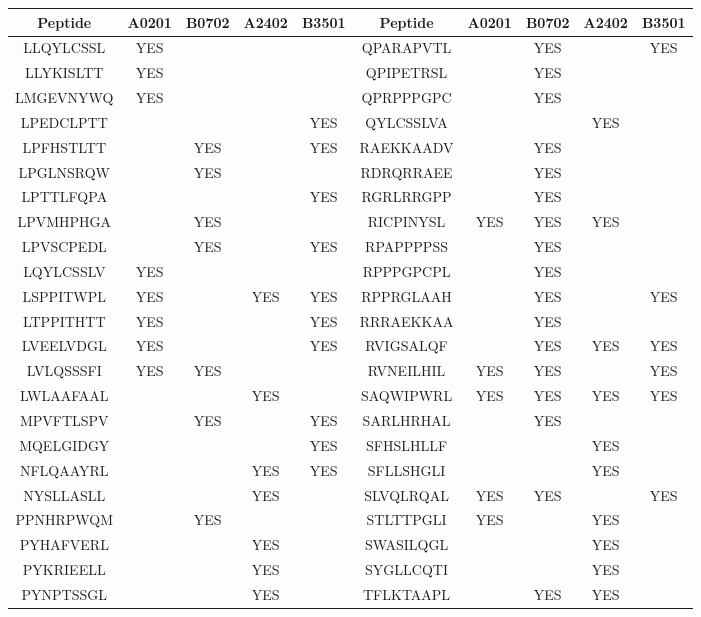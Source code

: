 \begin{table}[htp]
\begin{center}
\begin{sideways}
\begin{tabulary}{1.5\textwidth}{|c|c|c|c|c|c|c|c|c|c|}
\hline
Peptide & A0201 & B0702 & A2402 & B3501 & Peptide & A0201 & B0702 & A2402 & B3501 \bigstrut \\
\hline
LLQYLCSSL & YES &  &  &  & QPARAPVTL &  & YES &  & YES \bigstrut[t] \\
LLYKISLTT & YES &  &  &  & QPIPETRSL &  & YES &  &  \\
LMGEVNYWQ & YES &  &  &  & QPRPPPGPC &  & YES &  &  \\
LPEDCLPTT &  &  &  & YES & QYLCSSLVA &  &  & YES &  \\
LPFHSTLTT &  & YES &  & YES & RAEKKAADV &  & YES &  &  \\
LPGLNSRQW &  & YES &  &  & RDRQRRAEE &  & YES &  &  \\
LPTTLFQPA &  &  &  & YES & RGRLRRGPP &  & YES &  &  \\
LPVMHPHGA &  & YES &  &  & RICPINYSL & YES & YES & YES &  \\
LPVSCPEDL &  & YES &  & YES & RPAPPPPSS &  & YES &  &  \\
LQYLCSSLV & YES &  &  &  & RPPPGPCPL &  & YES &  &  \\
LSPPITWPL & YES &  & YES & YES & RPPRGLAAH &  & YES &  & YES \\
LTPPITHTT & YES &  &  & YES & RRRAEKKAA &  & YES &  &  \\
LVEELVDGL & YES &  &  & YES & RVIGSALQF &  & YES & YES & YES \\
LVLQSSSFI & YES & YES &  &  & RVNEILHIL & YES & YES &  & YES \\
LWLAAFAAL &  &  & YES &  & SAQWIPWRL & YES & YES & YES & YES \\
MPVFTLSPV &  & YES &  & YES & SARLHRHAL &  & YES &  &  \\
MQELGIDGY &  &  &  & YES & SFHSLHLLF &  &  & YES &  \\
NFLQAAYRL &  &  & YES & YES & SFLLSHGLI &  &  & YES &  \\
NYSLLASLL &  &  & YES &  & SLVQLRQAL & YES & YES &  & YES \\
PPNHRPWQM &  & YES &  &  & STLTTPGLI & YES &  & YES &  \\
PYHAFVERL &  &  & YES &  & SWASILQGL &  &  & YES &  \\
PYKRIEELL &  &  & YES &  & SYGLLCQTI &  &  & YES &  \\
PYNPTSSGL &  &  & YES &  & TFLKTAAPL &  & YES & YES &  \\

\end{tabulary}
\end{sideways}
\end{center}
\end{table}
